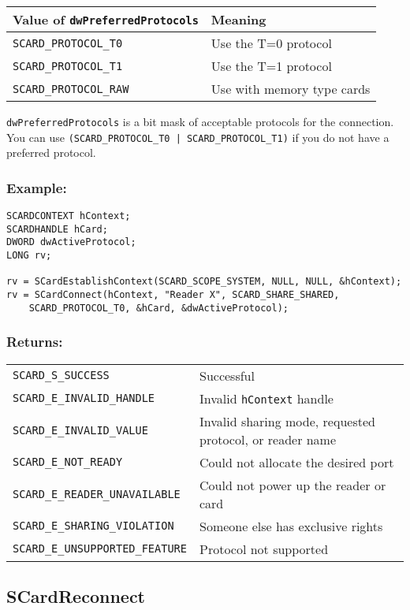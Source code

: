 \documentclass[a4paper,12pt]{article}
\newcommand{\example}{\subsubsection{Example:}}
\newcommand{\returns}{\subsubsection{Returns:}}
\begin{document}
\begin{tabular}{|l|l|}
\hline
Value of \texttt{dwPreferredProtocols} & Meaning \\
\hline
\hline
\texttt{SCARD\_PROTOCOL\_T0} & Use the T=0 protocol \\
\hline
\texttt{SCARD\_PROTOCOL\_T1} & Use the T=1 protocol \\
\hline
\texttt{SCARD\_PROTOCOL\_RAW} & Use with memory type cards \\
\hline
\end{tabular}

\texttt{dwPreferredProtocols} is a bit mask of acceptable protocols for
the connection. You can use \texttt{(SCARD\_PROTOCOL\_T0 |
SCARD\_PROTOCOL\_T1)} if you do not have a preferred protocol.

\example

\begin{verbatim}
SCARDCONTEXT hContext;
SCARDHANDLE hCard;
DWORD dwActiveProtocol;
LONG rv;

rv = SCardEstablishContext(SCARD_SCOPE_SYSTEM, NULL, NULL, &hContext);
rv = SCardConnect(hContext, "Reader X", SCARD_SHARE_SHARED,
    SCARD_PROTOCOL_T0, &hCard, &dwActiveProtocol);
\end{verbatim}

\returns

\begin{tabular}{ll}
\texttt{SCARD\_S\_SUCCESS}  & Successful\\
\texttt{SCARD\_E\_INVALID\_HANDLE} & Invalid \texttt{hContext} handle\\
\texttt{SCARD\_E\_INVALID\_VALUE} & Invalid sharing mode, requested protocol, or reader name\\
\texttt{SCARD\_E\_NOT\_READY} & Could not allocate the desired port\\
\texttt{SCARD\_E\_READER\_UNAVAILABLE} & Could not power up the reader or card\\
\texttt{SCARD\_E\_SHARING\_VIOLATION} & Someone else has exclusive rights\\
\texttt{SCARD\_E\_UNSUPPORTED\_FEATURE} & Protocol not supported\\
\end{tabular}


\subsection{SCardReconnect}
\end{document}

